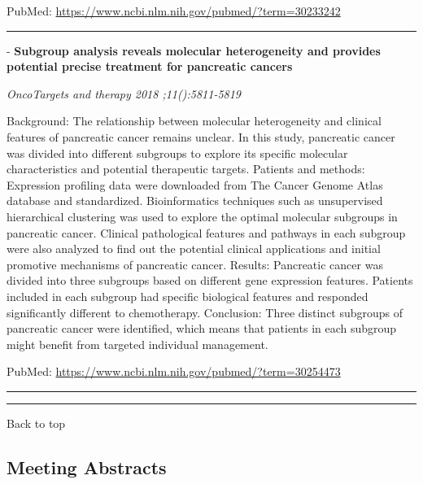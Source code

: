 \documentclass[]{article}
\begin{document}
PubMed: \url{https://www.ncbi.nlm.nih.gov/pubmed/?term=30233242}

{}

{}

\begin{center}\rule{0.5\linewidth}{\linethickness}\end{center}

 - \textbf{Subgroup analysis reveals molecular heterogeneity and
provides potential precise treatment for pancreatic cancers}

\emph{OncoTargets and therapy 2018 ;11():5811-5819}

Background: The relationship between molecular heterogeneity and
clinical features of pancreatic cancer remains unclear. In this study,
pancreatic cancer was divided into different subgroups to explore its
specific molecular characteristics and potential therapeutic targets.
Patients and methods: Expression profiling data were downloaded from The
Cancer Genome Atlas database and standardized. Bioinformatics techniques
such as unsupervised hierarchical clustering was used to explore the
optimal molecular subgroups in pancreatic cancer. Clinical pathological
features and pathways in each subgroup were also analyzed to find out
the potential clinical applications and initial promotive mechanisms of
pancreatic cancer. Results: Pancreatic cancer was divided into three
subgroups based on different gene expression features. Patients included
in each subgroup had specific biological features and responded
significantly different to chemotherapy. Conclusion: Three distinct
subgroups of pancreatic cancer were identified, which means that
patients in each subgroup might benefit from targeted individual
management.

PubMed: \url{https://www.ncbi.nlm.nih.gov/pubmed/?term=30254473}

{}

{}

\begin{center}\rule{0.5\linewidth}{\linethickness}\end{center}

\begin{center}\rule{0.5\linewidth}{\linethickness}\end{center}

Back to top

\pagebreak

\hypertarget{meeting-abstracts}{%
\subsection{Meeting Abstracts}\label{meeting-abstracts}}
\end{document}
